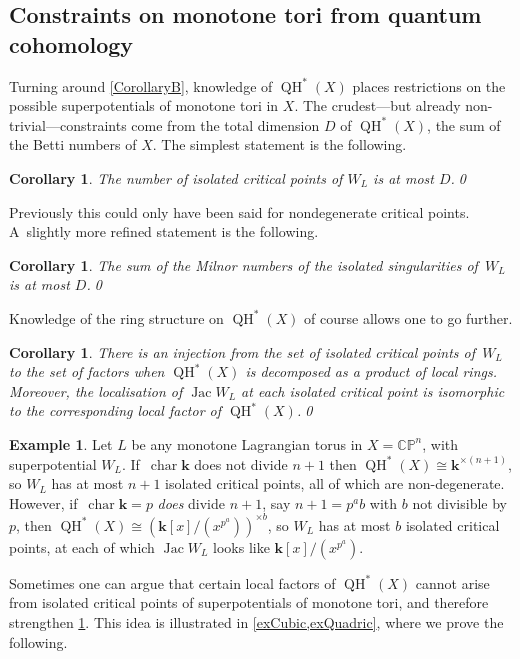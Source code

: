 \documentclass[JEP,XML,SOM,Unicode,NoEqCountersInSection,NoFloatCountersInSection,published]{cedram}
\newtheorem{corollary}[theorem]{Corollary}
\theoremstyle{definition}
\newtheorem{example}[theorem]{Example}
\newcommand{\CC}{\mathbb{C}}
\newcommand{\PP}{\mathbb{P}}
\newcommand{\kk}{{\boldsymbol{k}}}
\newcommand{\Char}{\operatorname{char}}
\newcommand{\QH}{\operatorname{QH}}
\newcommand{\Jac}{\operatorname{Jac}}
\begin{document}
\subsection{Constraints on monotone tori from quantum cohomology}

Turning around \cref{CorollaryB}, knowledge of $\QH^*(X)$ places restrictions on the possible superpotentials of monotone tori in $X$. The crudest---but already non-trivial---constraints come from the total dimension $D$ of $\QH^*(X)$, \ie the sum of the Betti numbers of $X$. The simplest statement is the following.

\begin{corollary}
The number of isolated critical points of $W_L$ is at most $D$.\qed
\end{corollary}

Previously this could only have been said for nondegenerate critical points. A~slight\-ly more refined statement is the following.

\begin{corollary}
The sum of the Milnor numbers of the isolated singularities of~$W_L$ is at most $D$.\qed
\end{corollary}

Knowledge of the ring structure on $\QH^*(X)$ of course allows one to go further.

\begin{corollary}
\label{corLocalFactors}
There is an injection from the set of isolated critical points of~$W_L$ to the set of factors when $\QH^*(X)$ is decomposed as a product of local rings. Moreover, the localisation of $\Jac W_L$ at each isolated critical point is isomorphic to the corresponding local factor of $\QH^*(X)$.\qed
\end{corollary}

\begin{example}
Let $L$ be any monotone Lagrangian torus in $X = \CC\PP^n$, with superpotential $W_L$. If~$\Char \kk$ does not divide $n+1$ then $\QH^*(X) \cong \kk^{\times (n+1)}$, so $W_L$ has at most $n+1$ isolated critical points, all of which are non-degenerate. However, if~$\Char \kk = p$ \emph{does} divide $n+1$, say $n+1 = p^ab$ with $b$ not divisible by $p$, then $\QH^*(X) \cong (\kk[x] / (x^{p^a}))^{\times b}$, so $W_L$ has at most $b$ isolated critical points, at each of which $\Jac W_L$ looks like $\kk[x] / (x^{p^a})$.
\end{example}

Sometimes one can argue that certain local factors of $\QH^*(X)$ cannot arise from isolated critical points of superpotentials of monotone tori, and therefore strengthen \cref{corLocalFactors}. This idea is illustrated in \cref{exCubic,exQuadric}, where we prove the following.
\end{document}
